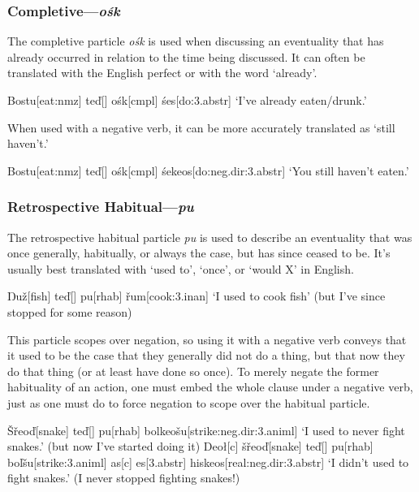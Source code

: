 \documentclass[a4paper,11pt,oneside,openany]{memoir}
\newcommand{\vd}{ď}
\newcommand{\vz}{ž}
\newcommand{\vs}{š}
\newcommand{\vr}{ř}
\newcommand{\vl}{ľ}
\newcommand{\vS}{Š}
\newcommand{\Engma}{Ŋ}
\begin{document}
\subsubsection{Completive---\textit{o\'sk}}

The completive particle \textit{o\'sk} is used when discussing an eventuality that has already occurred in relation to the time being discussed. It can often be translated with the English perfect or with the word `already'.

\ex 
\begingl
Bostu[eat:{\sc nmz}]
te\vd[]
o\'sk[\sc cmpl]
\'ses[do:{\sc 3.abstr}]
\glft `I've already eaten/drunk.'
\endgl
\xe

When used with a negative verb, it can be more accurately translated as `still haven't.'

\ex 
\begingl
Bostu[eat:{\sc nmz}]
te\vd[]
o\'sk[\sc cmpl]
\'sekeos[do:{\sc neg.dir:3.abstr}]
\glft `You still haven't eaten.'
\endgl
\xe

\subsubsection{Retrospective Habitual---\textit{pu}}

The retrospective habitual particle \textit{pu} is used to describe an eventuality that was once generally, habitually, or always the case, but has since ceased to be. It's usually best translated with `used to', `once', or `would X' in English.

\ex 
\begingl
\Engma u\vz[fish]
te\vd[]
pu[\sc rhab]
\vr um[cook:{\sc 3.inan}]
\glft `I used to cook fish' (but I've since stopped for some reason)
\endgl
\xe

This particle scopes over negation, so using it with a negative verb conveys that it used to be the case that they generally did not do a thing, but that now they do that thing (or at least have done so once). To merely negate the former habituality of an action, one must embed the whole clause under a negative verb, just as one must do to force negation to scope over the habitual particle.

\pex 
\a
\begingl 
\vS\vr eo\vd[snake]
te\vd[]
pu[\sc rhab]
bolkeo\vs u[strike:{\sc neg.dir:3.animl}]
\glft `I used to never fight snakes.' (but now I've started doing it)
\endgl 
\a
\begingl
Deo\l[\sc c]
\vs\vr eo\vd[snake]
te\vd[]
pu[\sc rhab]
bo\vl\vs u[strike:{\sc 3.animl}]
\nogloss{,}
as[\sc c]
es[\sc 3.abstr]
his\engma keos[real:{\sc neg.dir:3.abstr}]
\glft `I didn't used to fight snakes.' (I never stopped fighting snakes!)
\endgl 
\xe
\end{document}

